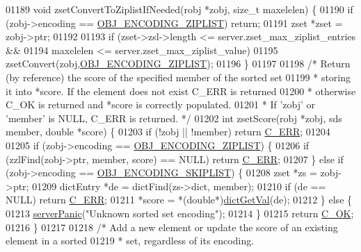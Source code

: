 \begin{DoxyCode}
01189 \textcolor{keywordtype}{void} zsetConvertToZiplistIfNeeded(robj *zobj, size\_t maxelelen) \{
01190     \textcolor{keywordflow}{if} (zobj->encoding == \hyperlink{server_8h_aabf064ede983103f1fd0df2086e84eee}{OBJ\_ENCODING\_ZIPLIST}) \textcolor{keywordflow}{return};
01191     zset *zset = zobj->ptr;
01192 
01193     \textcolor{keywordflow}{if} (zset->zsl->length <= server.zset\_max\_ziplist\_entries &&
01194         maxelelen <= server.zset\_max\_ziplist\_value)
01195             zsetConvert(zobj,\hyperlink{server_8h_aabf064ede983103f1fd0df2086e84eee}{OBJ\_ENCODING\_ZIPLIST});
01196 \}
01197 
01198 \textcolor{comment}{/* Return (by reference) the score of the specified member of the sorted set}
01199 \textcolor{comment}{ * storing it into *score. If the element does not exist C\_ERR is returned}
01200 \textcolor{comment}{ * otherwise C\_OK is returned and *score is correctly populated.}
01201 \textcolor{comment}{ * If 'zobj' or 'member' is NULL, C\_ERR is returned. */}
01202 \textcolor{keywordtype}{int} zsetScore(robj *zobj, sds member, \textcolor{keywordtype}{double} *score) \{
01203     \textcolor{keywordflow}{if} (!zobj || !member) \textcolor{keywordflow}{return} \hyperlink{server_8h_af98ac28d5f4d23d7ed5985188e6fb7d1}{C\_ERR};
01204 
01205     \textcolor{keywordflow}{if} (zobj->encoding == \hyperlink{server_8h_aabf064ede983103f1fd0df2086e84eee}{OBJ\_ENCODING\_ZIPLIST}) \{
01206         \textcolor{keywordflow}{if} (zzlFind(zobj->ptr, member, score) == NULL) \textcolor{keywordflow}{return} \hyperlink{server_8h_af98ac28d5f4d23d7ed5985188e6fb7d1}{C\_ERR};
01207     \} \textcolor{keywordflow}{else} \textcolor{keywordflow}{if} (zobj->encoding == \hyperlink{server_8h_acfb35db5cb30ed113ed23aeb1a224c4c}{OBJ\_ENCODING\_SKIPLIST}) \{
01208         zset *zs = zobj->ptr;
01209         dictEntry *de = dictFind(zs->dict, member);
01210         \textcolor{keywordflow}{if} (de == NULL) \textcolor{keywordflow}{return} \hyperlink{server_8h_af98ac28d5f4d23d7ed5985188e6fb7d1}{C\_ERR};
01211         *score = *(\textcolor{keywordtype}{double}*)\hyperlink{dict_8h_ae8d2cc391873b2bea2b87c4f80f43120}{dictGetVal}(de);
01212     \} \textcolor{keywordflow}{else} \{
01213         \hyperlink{server_8h_a11cc378e7778a830b41240578de3b204}{serverPanic}(\textcolor{stringliteral}{"Unknown sorted set encoding"});
01214     \}
01215     \textcolor{keywordflow}{return} \hyperlink{server_8h_a303769ef1065076e68731584e758d3e1}{C\_OK};
01216 \}
01217 
01218 \textcolor{comment}{/* Add a new element or update the score of an existing element in a sorted}
01219 \textcolor{comment}{ * set, regardless of its encoding.}

\end{DoxyCode}
